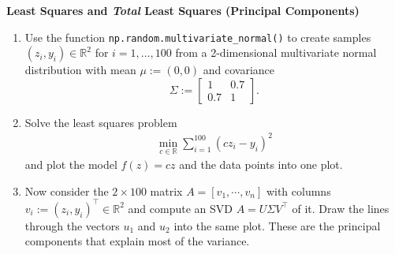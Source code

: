 \textbf{\normalsize Least Squares and \textit{Total} Least Squares (Principal Components)}

\begin{enumerate}
	\item  Use the function \verb|np.random.multivariate_normal()| to create samples $(z_i,y_i) \in \mathbb{R}^2$ for $i = 1,\dots, 100$ from a 2-dimensional multivariate normal distribution
	with mean $\mu := (0,0)$ and covariance $$\Sigma := \begin{bmatrix}
	1&0.7\\
	0.7&1
	\end{bmatrix}.$$
	\item Solve the least squares problem
		\begin{align*}
			\min \limits_{c \in \mathbb{R}} \sum_{i=1}^{100} ( c z_i - y_i )^2
		\end{align*}
		and plot the model $f(z)=cz$ and the data points into one plot.
\item Now consider the $2\times100$ matrix $A = [v_1,\cdots, v_n]$ with columns $v_i := (z_i,y_i)^\top \in \mathbb{R}^2$ and compute an SVD $A=U\Sigma V^\top$ of it. Draw the lines through the vectors $u_1$ and $u_2$ into the same plot. These are the principal components that explain most of the variance.~\\

\end{enumerate}

%
